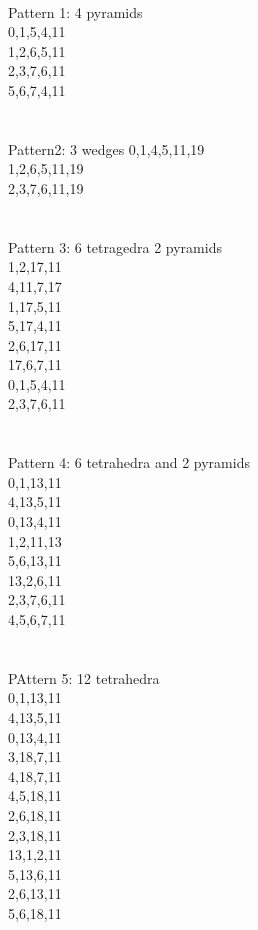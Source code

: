 \documentclass[twocolumn]{article}
\begin{document}
 \\
        \tiny Pattern 1: 4 pyramids \\
\tiny 0,1,5,4,11 \\
\tiny 1,2,6,5,11 \\
\tiny 2,3,7,6,11 \\
\tiny 5,6,7,4,11 \\
\tiny   \\

  
  \\ 
\tiny Pattern2: 3 wedges
\tiny 0,1,4,5,11,19 \\
\tiny 1,2,6,5,11,19 \\
\tiny 2,3,7,6,11,19 \\
\tiny   \\

 \\ 
\tiny Pattern 3: 6 tetragedra 2 pyramids \\
\tiny 1,2,17,11 \\
\tiny 4,11,7,17 \\
\tiny 1,17,5,11 \\
\tiny 5,17,4,11 \\
\tiny 2,6,17,11 \\
\tiny 17,6,7,11 \\
\tiny 0,1,5,4,11 \\
\tiny 2,3,7,6,11 \\
\tiny   \\

 \\
        \tiny Pattern 4: 6 tetrahedra and 2 pyramids \\
\tiny 0,1,13,11 \\
\tiny 4,13,5,11 \\
\tiny 0,13,4,11 \\
\tiny 1,2,11,13 \\
\tiny 5,6,13,11 \\
\tiny 13,2,6,11 \\
\tiny 2,3,7,6,11 \\
\tiny 4,5,6,7,11 \\
\tiny   \\

 \\
        \tiny PAttern 5: 12 tetrahedra \\
\tiny 0,1,13,11 \\
\tiny 4,13,5,11 \\
\tiny 0,13,4,11 \\
\tiny 3,18,7,11 \\
\tiny 4,18,7,11 \\
\tiny 4,5,18,11 \\
\tiny 2,6,18,11 \\
\tiny 2,3,18,11 \\
\tiny 13,1,2,11 \\
\tiny 5,13,6,11 \\
\tiny 2,6,13,11 \\
\tiny 5,6,18,11 \\
\end{document}
